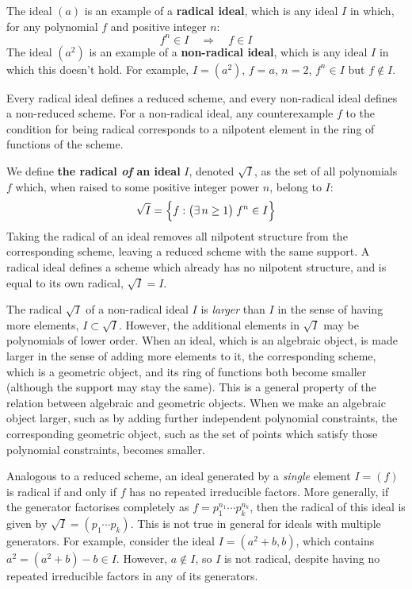 \documentclass[12pt]{article}
\begin{document}
The ideal $(a)$ is an example of a \textbf{radical ideal}, which is any ideal $I$ in which, for any polynomial $f$ and positive integer $n$:
\[
f^n\in I\quad \Longrightarrow\quad f\in I
\]
The ideal $(a^2)$ is an example of a \textbf{non-radical ideal}, which is any ideal $I$ in which this doesn't hold. For example, $I=(a^2)$, $f=a$, $n=2$, $f^n\in I$ but $f\notin I$.

Every radical ideal defines a reduced scheme, and every non-radical ideal defines a non-reduced scheme. For a non-radical ideal, any counterexample $f$ to the condition for being radical corresponds to a nilpotent element in the ring of functions of the scheme.

We define \textbf{the radical \emph{of} an ideal} $I$, denoted $\sqrt{I}$, as the set of all polynomials $f$ which, when raised to some positive integer power $n$, belong to $I$:
\[
\sqrt{I} = \Bigl\{f:\bigl( \exists\, n \ge 1 \bigr)\; f^n\in I\Bigr\}
\]
Taking the radical of an ideal removes all nilpotent structure from the corresponding scheme, leaving a reduced scheme with the same support. A radical ideal defines a scheme which already has no nilpotent structure, and is equal to its own radical, $\sqrt{I}=I$.

The radical $\sqrt{I}$ of a non-radical ideal $I$ is \emph{larger} than $I$ in the sense of having more elements, $I\subset\sqrt{I}$. However, the additional elements in $\sqrt{I}$ may be polynomials of lower order. When an ideal, which is an algebraic object, is made larger in the sense of adding more elements to it, the corresponding scheme, which is a geometric object, and its ring of functions both become smaller (although the support may stay the same). This is a general property of the relation between algebraic and geometric objects. When we make an algebraic object larger, such as by adding further independent polynomial constraints, the corresponding geometric object, such as the set of points which satisfy those polynomial constraints, becomes smaller.

Analogous to a reduced scheme, an ideal generated by a \emph{single} element $I=(f)$ is radical if and only if $f$ has no repeated irreducible factors. More generally, if the generator factorises completely as $f=p_1^{n_1}\cdots p_k^{n_k}$, then the radical of this ideal is given by $\sqrt{I}=(p_1\cdots p_k)$. This is not true in general for ideals with multiple generators. For example, consider the ideal $I=(a^2+b,b)$, which contains $a^2=(a^2+b)-b\in I$. However, $a\notin I$, so $I$ is not radical, despite having no repeated irreducible factors in any of its generators.
\end{document}
